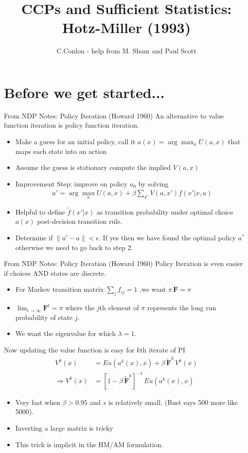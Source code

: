 \documentclass[xcolor=pdftex,dvipsnames,table,mathserif,aspectratio=169]{beamer}
\title{CCPs and Sufficient Statistics: Hotz-Miller (1993)}
\author{C.Conlon - help from M. Shum and Paul Scott}
\institute{Grad IO }
\date{}
\begin{document}
\begin{frame}
\titlepage
\end{frame}


\section{Before we get started...}

\begin{frame}{From NDP Notes: Policy Iteration (Howard 1960)}
An alternative to value function iteration is policy function iteration. 
\begin{itemize}
\item Make a guess for an initial policy, call it $a(x) = \arg \max_a U(a,x)$ that maps each state into an action
\item Assume the guess is stationary compute the implied $V(a,x)$
\item Improvement Step: improve on policy $a_0$ by solving 
\begin{eqnarray*}
a' = \arg \max_a U(a,x) + \beta \sum_{x'} V(a,x') f (x' | x,a)
\end{eqnarray*}
\item Helpful to define $\tilde{f}(x' | x)$ as transition probability under optimal choice $a(x)$ \alert{post-decision transition rule}.
\item Determine if $\| a' -a\| < \epsilon$. If yes then we have found the optimal policy $a^* $ otherwise we need to go back to step 2.
\end{itemize}
\end{frame}

\begin{frame}{From NDP Notes:  Policy Iteration (Howard 1960)}
\footnotesize
Policy Iteration is even easier if choices AND states are discrete.
\begin{itemize}
\item For Markov transition matrix $\sum_j f_{ij} =1$ ,we want $\pi \, \mathbf{F} = \pi$
\item $\lim_{t \rightarrow \infty} \mathbf{F}^t = \pi$ where the $j$th element of $\pi$ represents the long run probability of state $j$.
\item We want the eigenvalue for which $\lambda = 1$.
\end{itemize}
Now updating the value function is easy for $k$th iterate of PI
\begin{align*}
V^k(x) &= Eu(a^k(x),x) + \beta \, \mathbf{\tilde{F}}^k \, V^k(x)\\
\Rightarrow V^k(x) &= [1 - \beta \, \mathbf{\tilde{F}}^k]^{-1}\, Eu(a^k(x),x)
\end{align*}
\vspace{-.5cm}
\begin{itemize}
\item Very fast when $\beta > 0.95$ and $s$ is relatively small. (Rust says 500 more like 5000).
\item Inverting a large matrix is tricky
\item \alert{This trick is implicit in the HM/AM formulation}.
\end{itemize}
\end{frame}
\end{document}
